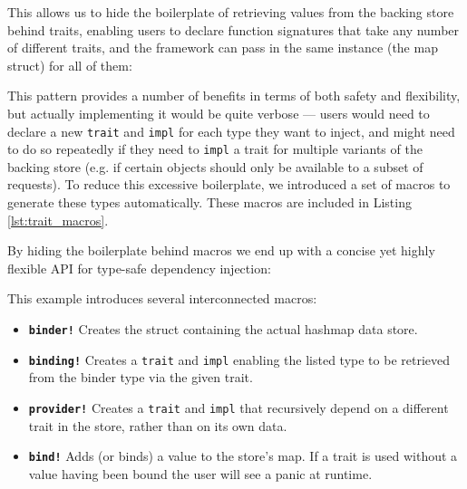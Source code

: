 \documentclass[sigconf]{acmart}
\def\code#1{\lstinline{#1}}
\begin{document}
\begin{minipage}{\linewidth}

\end{minipage}

This allows us to hide the boilerplate of retrieving values from the backing store behind traits, enabling users to declare function signatures that take any number of different traits, and the framework can pass in the same instance (the map struct) for all of them:

\begin{minipage}{\linewidth}

\end{minipage}

This pattern provides a number of benefits in terms of both safety and flexibility, but actually implementing it would be quite verbose --- users would need to declare a new \code{trait} and \code{impl} for each type they want to inject, and might need to do so repeatedly if they need to \code{impl} a trait for multiple variants of the backing store (e.g. if certain objects should only be available to a subset of requests). To reduce this excessive boilerplate, we introduced a set of macros to generate these types automatically. These macros are included in Listing \ref{lst:trait_macros}.



By hiding the boilerplate behind macros we end up with a concise yet highly flexible API for type-safe dependency injection:

\begin{minipage}{\linewidth}

\end{minipage}

This example introduces several interconnected macros:

\begin{itemize}
\item \textbf{\code{binder!}} Creates the struct containing the actual hashmap data store.
\item \textbf{\code{binding!}} Creates a \code{trait} and \code{impl} enabling the listed type to be retrieved from the binder type via the given trait.
\item \textbf{\code{provider!}} Creates a \code{trait} and \code{impl} that recursively depend on a different trait in the store, rather than on its own data.
\item \textbf{\code{bind!}} Adds (or binds) a value to the store's map. If a trait is used without a value having been bound the user will see a panic at runtime.
\end{itemize}
\end{document}
